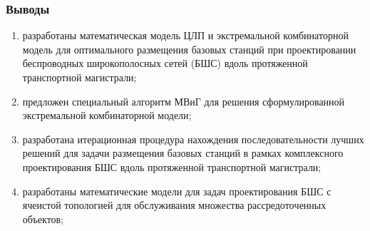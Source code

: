 \begin{frame}
    \frametitle{Выводы}
    
    \begin{enumerate}
        \item разработаны математическая модель ЦЛП и экстремальной комбинаторной модель для оптимального размещения базовых станций при
        проектировании беспроводных широкополосных сетей (БШС) вдоль протяженной транспортной магистрали;
        \item предложен специальный алгоритм МВиГ для решения сформулированной
        экстремальной комбинаторной модели;
        \item разработана итерационная процедура нахождения последовательности лучших
        решений для задачи размещения базовых станций в рамках комплексного
        проектирования БШС вдоль протяженной транспортной магистрали;
        \item разработаны математические модели для задач проектирования БШС с ячеистой
        топологией для обслуживания множества рассредото­ченных объектов;
    \end{enumerate}
\end{frame}

